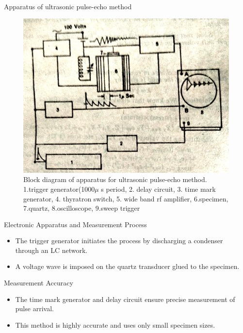 \documentclass[aspectratio=43]{beamer}
\begin{document}
\begin{frame}{Apparatus of ultrasonic pulse-echo method}
    \begin{figure}[H]
        \centering
        \includegraphics[scale=0.23]{images/4.png}
        \caption{Block diagram of apparatus for ultrasonic pulse-echo method.  1.trigger generator(1000$\mu$ s period, 2. delay circuit, 3. time mark generator, 4. thyratron switch, 5. wide band rf amplifier, 6.specimen, 7.quartz, 8.oscilloscope, 9.sweep trigger}
    \end{figure}
\end{frame}

\begin{frame}{Electronic Apparatus and Measurement Process}
    \begin{itemize}
        \item The trigger generator initiates the process by discharging a condenser through an LC network.
        \item A voltage wave is imposed on the quartz transducer glued to the specimen.
    \end{itemize}
\end{frame}

\begin{frame}{Measurement Accuracy}
    \begin{itemize}
        \item The time mark generator and delay circuit ensure precise measurement of pulse arrival.
        \item This method is highly accurate and uses only small specimen sizes.
    \end{itemize}
\end{frame}
\end{document}
